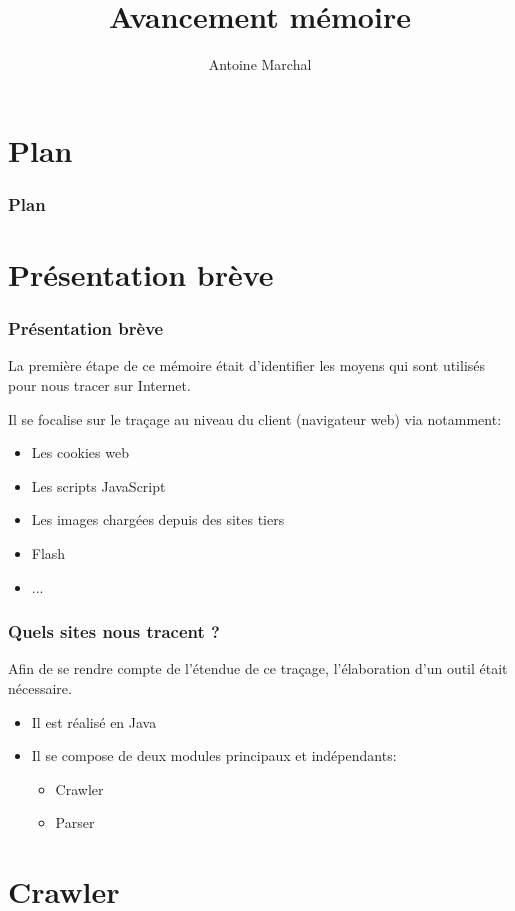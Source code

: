 \documentclass{beamer}
\title{Avancement mémoire}
\author{Antoine Marchal}
\begin{document}
  \begin{frame}
  \titlepage
  \end{frame}

  \section*{Plan}
  \begin{frame}
  \frametitle{Plan}
    \tableofcontents[]
  \end{frame} 

  \section{Présentation brève}
  \begin{frame}
  \frametitle{Présentation brève}
  La première étape de ce mémoire était d'identifier les moyens qui sont utilisés pour nous tracer sur Internet.
  
  Il se focalise sur le traçage au niveau du client (navigateur web) via notamment:
    \begin{itemize}
      \item Les cookies web
      \item Les scripts JavaScript
      \item Les images chargées depuis des sites tiers
      \item Flash
      \item ...
    \end{itemize}
  \end{frame}

  \begin{frame}
  \frametitle{Quels sites nous tracent ?}
  Afin de se rendre compte de l'étendue de ce traçage, l'élaboration d'un outil était nécessaire.
   \begin{itemize}
    \item Il est réalisé en Java
    \item Il se compose de deux modules principaux et indépendants:
      \begin{itemize}
        \item Crawler
        \item Parser
      \end{itemize}
    \end{itemize}
  \end{frame}
  
  \section{Crawler}
\end{document}
